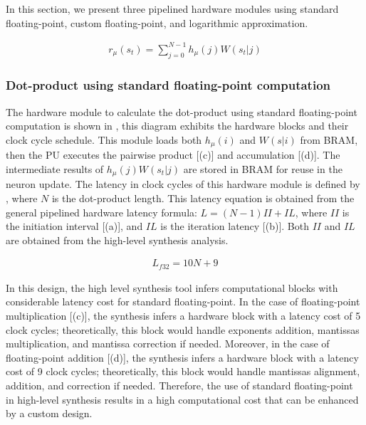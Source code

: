 In this section, we present three pipelined hardware modules using standard floating-point, custom floating-point, and logarithmic approximation.

\begin{eqnarray} \label{eq:dot_product}
r_{\mu}\left(s_t\right)=\sum_{j=0}^{N-1}h_{\mu}(j)W(s_t|j)
\end{eqnarray}



\subsubsection{Dot-product using standard floating-point computation}
 The hardware module to calculate the dot-product using standard floating-point computation is shown in , this diagram exhibits the hardware blocks and their clock cycle schedule. This module loads both $h_\mu(i)$ and $W(s|i)$ from BRAM, then the PU executes the pairwise product [(c)] and accumulation [(d)]. The intermediate results of $h_\mu(j) W(s_t|j)$ are stored in BRAM for reuse in the neuron update. The latency in clock cycles of this hardware module is defined by , where $N$ is the dot-product length. This latency equation is obtained from the general pipelined hardware latency formula: $L=\left(N-1\right)II+IL$, where $II$ is the initiation interval [(a)], and $IL$ is the iteration latency [(b)]. Both $II$ and $IL$ are obtained from the high-level synthesis analysis.
 
 \begin{eqnarray} \label{eq:dot_standard_float_latency}
 L_{f32}=10N+9
 \end{eqnarray}
 
In this design, the high level synthesis tool infers computational blocks with considerable latency cost for standard floating-point. In the case of floating-point multiplication [(c)], the synthesis infers a hardware block with a latency cost of 5 clock cycles; theoretically, this block would handle exponents addition, mantissas multiplication, and mantissa correction if needed. Moreover, in the case of floating-point addition [(d)], the synthesis infers a hardware block with a latency cost of 9 clock cycles; theoretically, this block would handle mantissas alignment, addition, and correction if needed. Therefore, the use of standard floating-point in high-level synthesis results in a high computational cost that can be enhanced by a custom design.


